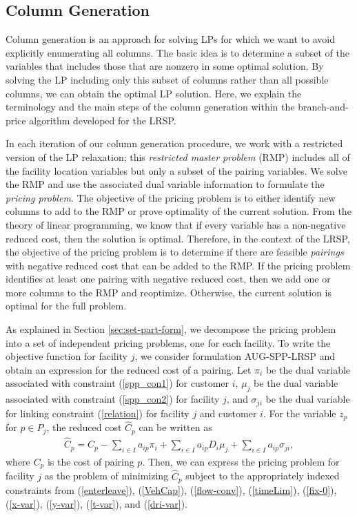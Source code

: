 \documentclass[11pt]{article}
\begin{document}
\subsection {Column Generation}
\label{sec:PricingProb}
Column generation is an approach for solving LPs for which we want to avoid explicitly enumerating
all columns.  The basic idea is to determine a subset of the variables that includes 
those that are nonzero in some optimal solution. By solving the LP including only this subset of 
columns rather than all possible columns, we can obtain the optimal LP solution. 
Here, we explain the terminology and the main steps of the column generation within the branch-and-price
algorithm developed for the LRSP.  

In each iteration of our column generation procedure, we work with a restricted version of the LP relaxation; this
{\em restricted master problem} (RMP) includes all of the facility location variables but
only a subset of the pairing variables.  We solve the RMP and use the associated dual variable
information to formulate the {\em pricing problem}.  The objective
of the pricing problem is to either identify new columns to add to the RMP or prove 
optimality of the current solution. From the theory of linear programming, we know that 
if every variable has a non-negative reduced cost, then the solution is optimal.  Therefore, 
in the context of the LRSP, the objective
of the pricing problem is to determine if there are feasible {\em pairings} with negative reduced
cost that can be added to the RMP.  If the pricing problem identifies at least one pairing with 
negative reduced cost, then we add one or more 
columns to the RMP and reoptimize.  Otherwise, the current solution is optimal for the full problem.

As explained in Section \ref{sec:set-part-form}, we decompose the pricing problem
into a set of independent pricing problems, one for each facility. 
To write the objective function for facility $j$, 
we consider formulation AUG-SPP-LRSP and obtain an expression for the reduced
cost of a pairing.  
 Let $\pi_{i}$ be the dual variable 
associated with constraint (\ref{spp_con1}) for customer $i$, $\mu_{j}$ be 
the dual variable associated with constraint (\ref{spp_con2}) 
for facility $j$, and $\sigma_{ji}$ be the dual variable for linking 
constraint (\ref{relation}) for facility $j$ and customer $i$. 
For the variable $z_{p}$ for $p \in P_{j}$, the reduced cost $\hat{C}_{p}$
can be written as   
\begin{eqnarray}
\label{red-cost}
\hat{C}_{p}=C_{p}-\sum_{i\in I}a_{ip} \pi_{i}+\sum_{i \in I}a_{ip} D_{i} \mu_{j}+\sum_{i \in I} a_{ip} \sigma_{ji},
\end{eqnarray} 
where $C_{p}$ is the cost of pairing $p$. 
Then, we can express the pricing problem for facility $j$ as the problem of 
minimizing $\hat{C}_p$ subject to the appropriately indexed constraints 
from (\ref{enterleave}), (\ref{VehCap}),
(\ref{flow-conv}), (\ref{timeLim}), (\ref{fix-0}), (\ref{x-var}), (\ref{y-var}), (\ref{t-var}), 
and (\ref{dri-var}).
\end{document}

